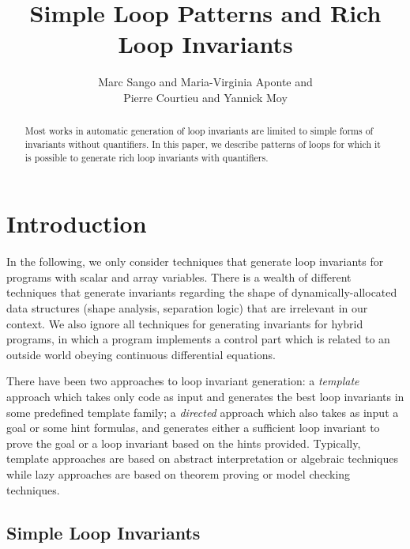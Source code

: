 \documentclass[a4paper,10pt]{article}
\begin{document}
\title{Simple Loop Patterns and Rich Loop Invariants}
\author{Marc Sango and Maria-Virginia Aponte and \\ Pierre Courtieu and Yannick Moy}
\date{}

\maketitle

\begin{abstract}
  Most works in automatic generation of loop invariants are limited to simple
  forms of invariants without quantifiers. In this paper, we describe patterns
  of loops for which it is possible to generate rich loop invariants with
  quantifiers.
\end{abstract}

\section{Introduction}

In the following, we only consider techniques that generate loop invariants for
programs with scalar and array variables. There is a wealth of different
techniques that generate invariants regarding the shape of
dynamically-allocated data structures (shape analysis, separation logic) that
are irrelevant in our context. We also ignore all techniques for generating
invariants for hybrid programs, in which a program implements a control part
which is related to an outside world obeying continuous differential equations.

There have been two approaches to loop invariant generation: a
\textit{template} approach which takes only code as input and generates the
best loop invariants in some predefined template family; a \textit{directed}
approach which also takes as input a goal or some hint formulas, and generates
either a sufficient loop invariant to prove the goal or a loop invariant based
on the hints provided. Typically, template approaches are based on abstract
interpretation or algebraic techniques while lazy approaches are based on
theorem proving or model checking techniques.

\subsection{Simple Loop Invariants}
\end{document}
